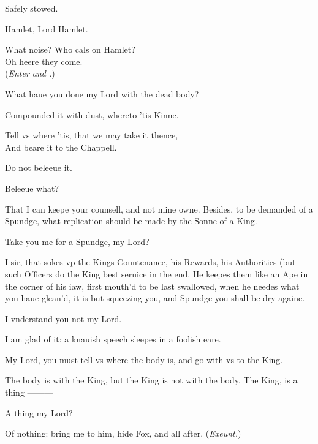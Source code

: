 \documentclass[a5paper,DIV=calc,11pt]{scrbook}
\newcommand{\updatemarks}{\markboth{Act \Roman{act}}{Scene \Roman{act}--\Roman{scene}}}
\begin{document}
\begin{drama*}
    \hamspeaks Safely stowed.
    
     Hamlet, Lord Hamlet.
    
    \hamspeaks What noise? Who cals on Hamlet?\\
    Oh heere they come.\\
    (\textit{Enter \rosin and \guil.})
    
    \rosinspeaks What haue you done my Lord with the dead body?
    
    \hamspeaks Compounded it with dust, whereto 'tis Kinne.
    
    \rosinspeaks Tell vs where 'tis, that we may take it thence,\\
    And beare it to the Chappell.
    
    \hamspeaks Do not beleeue it.
    
    \rosinspeaks Beleeue what?
    
    \hamspeaks That I can keepe your counsell, and not mine owne. Besides, to be demanded of a Spundge, what replication should be made by the Sonne of a King.
    
    \rosinspeaks Take you me for a Spundge, my Lord?
    
    \hamspeaks I sir, that sokes vp the Kings Countenance, his Rewards, his Authorities (but such Officers do the King best seruice in the end. He keepes them like an Ape in the corner of his iaw, first mouth'd to be last swallowed, when he needes what you haue glean'd, it is but squeezing you, and Spundge you shall be dry againe.
    
    \rosinspeaks I vnderstand you not my Lord.
    
    \hamspeaks I am glad of it: a knauish speech sleepes in a foolish eare.
    
    \rosinspeaks My Lord, you must tell vs where the body is, and go with vs to the King.
    
    \hamspeaks The body is with the King, but the King is not with the body. The King, is a thing ———
    
    \guilspeaks A thing my Lord?
    
    \hamspeaks Of nothing: bring me to him, hide Fox, and all after. \hfill(\textit{Exeunt.})
\end{drama*}

\scene

\updatemarks

\end{document}

